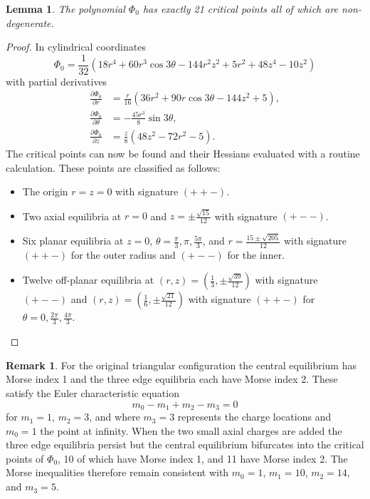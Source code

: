 \documentclass[12pt,a4paper]{article}
\theoremstyle{plain}
\newtheorem{lem}{Lemma}
\theoremstyle{definition}
\newtheorem{rmk}{Remark}
\begin{document}
	\begin{lem}\label{lem:Phi0-critical-oints}
		The polynomial \(\Phi_0\) has exactly 21 critical points all of which are non-degenerate. 
	\end{lem}
	\begin{proof}
		In cylindrical coordinates 
		\[\Phi_0=\frac{1}{32}\left(18 r^4+60 r^3 \cos3\theta -144 r^2 z^2+5 r^2+48 z^4-10 z^2\right)
		\]
		with partial derivatives
		\begin{align*}
			\frac{\partial\Phi_0}{\partial r}&=\frac{r}{16}\left(36 r^2+90 r \cos3 \theta-144 z^2+5\right),\\[.5em]
			\frac{\partial\Phi_0}{\partial \theta}&=-\frac{45r^3}{8}\sin 3\theta,\\[.5em]
			\frac{\partial\Phi_0}{\partial z}&=\frac{z}{8}(48z^2-72r^2-5).
		\end{align*}
		The critical points can now be found and their Hessians evaluated with a routine calculation. These points are classified as follows:
		\begin{itemize}
			\item[\ding{226}] The origin \(r=z=0\) with signature \((++-)\).
			\item[\ding{226}] Two axial equilibria at \(r=0\) and \(z=\pm\frac{\sqrt{15}}{12}\) with signature \((+--)\).
			\item[\ding{226}] Six planar equilibria at \(z=0\), \(\theta=\frac{\pi}{3},\pi,\frac{5\pi}{3}\), and \(r=\frac{15\pm\sqrt{205}}{12}\) with signature \((++-)\) for the outer radius and \((+--)\) for the inner.
			\item[\ding{226}] Twelve off-planar equilibria at \((r,z)=\left(\frac{1}{3},\pm\frac{\sqrt{39}}{12}\right)\) with signature \({(+--)}\) and \((r,z)=\left(\frac{1}{6},\pm\frac{\sqrt{21}}{12}\right)\) with signature \((++-)\) for \(\theta=0,\frac{2\pi}{3},\frac{4\pi}{3}\).
		\end{itemize}
	\end{proof}
	
	
	\begin{rmk}
		For the original triangular configuration the central equilibrium has Morse index 1 and the three edge equilibria each have Morse index 2. These satisfy the Euler characteristic equation
		\[
		m_0-m_1+m_2-m_3=0
		\]
		for \(m_1=1\), \(m_2=3\), and where \(m_3=3\) represents the charge locations and \(m_0=1\) the point at infinity. When the two small axial charges are added the three edge equilibria persist but the central equilibrium bifurcates into the critical points of \(\Phi_0\), 10 of which have Morse index 1, and 11 have Morse index 2. The Morse inequalities therefore remain consistent with \(m_0=1\), \(m_1=10\), \(m_2=14\), and \(m_3=5\).
	\end{rmk}
	
\end{document}
